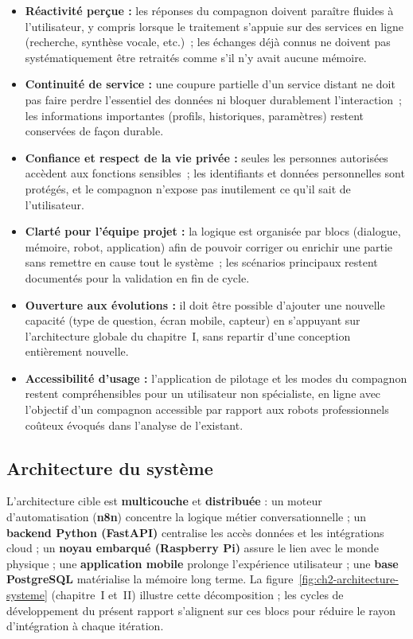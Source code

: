 \documentclass[a4paper,12pt]{report}
\begin{document}
	\begin{itemize}
		\item \textbf{Réactivité perçue :} les réponses du compagnon doivent paraître
		fluides à l'utilisateur, y compris lorsque le traitement s'appuie sur des
		services en ligne (recherche, synthèse vocale, etc.)~; les échanges déjà connus ne
		doivent pas systématiquement être retraités comme s'il n'y avait aucune mémoire.
		\item \textbf{Continuité de service :} une coupure partielle d'un service distant
		ne doit pas faire perdre l'essentiel des données ni bloquer durablement
		l'interaction~; les informations importantes (profils, historiques, paramètres)
		restent conservées de façon durable.
		\item \textbf{Confiance et respect de la vie privée :} seules les personnes
		autorisées accèdent aux fonctions sensibles~; les identifiants et données
		personnelles sont protégés, et le compagnon n'expose pas inutilement ce qu'il
		sait de l'utilisateur.
		\item \textbf{Clarté pour l'équipe projet :} la logique est organisée par blocs
		(dialogue, mémoire, robot, application) afin de pouvoir corriger ou enrichir une
		partie sans remettre en cause tout le système~; les scénarios principaux restent
		documentés pour la validation en fin de cycle.
		\item \textbf{Ouverture aux évolutions :} il doit être possible d'ajouter une
		nouvelle capacité (type de question, écran mobile, capteur) en s'appuyant sur
		l'architecture globale du chapitre~I, sans repartir d'une conception entièrement
		nouvelle.
		\item \textbf{Accessibilité d'usage :} l'application de pilotage et les modes du
		compagnon restent compréhensibles pour un utilisateur non spécialiste, en ligne
		avec l'objectif d'un compagnon \og accessible \fg{} par rapport aux robots
		professionnels coûteux évoqués dans l'analyse de l'existant.
	\end{itemize}
	
	\subsection{Architecture du système}
	
	L'architecture cible est \textbf{multicouche} et \textbf{distribuée} : un moteur
	d'automatisation (\textbf{n8n}) concentre la logique métier conversationnelle ; un
	\textbf{backend Python (FastAPI)} centralise les accès données et les intégrations
	cloud ; un \textbf{noyau embarqué (Raspberry Pi)} assure le lien avec le monde
	physique ; une \textbf{application mobile} prolonge l'expérience utilisateur ; une
	\textbf{base PostgreSQL} matérialise la mémoire long terme. La
	figure~\ref{fig:ch2-architecture-systeme} (chapitre~I et~II) illustre cette décomposition ; les cycles
	de développement du présent rapport s'alignent sur ces blocs pour réduire le
	rayon d'intégration à chaque itération.
	
\end{document}
